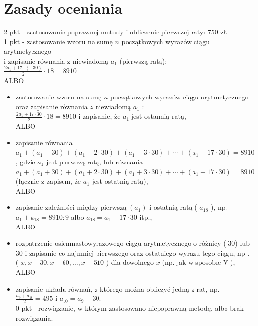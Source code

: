 \documentclass[10pt]{article}
\begin{document}
\section*{Zasady oceniania}
2 pkt - zastosowanie poprawnej metody i obliczenie pierwszej raty: 750 zł.\\
1 pkt - zastosowanie wzoru na sumę $n$ początkowych wyrazów ciągu arytmetycznego\\
i zapisanie równania z niewiadomą $a_{1}$ (pierwszą ratą):\\
$\frac{2 a_{1}+17 \cdot(-30)}{2} \cdot 18=8910$\\
ALBO

\begin{itemize}
  \item zastosowanie wzoru na sumę $n$ początkowych wyrazów ciągu arytmetycznego oraz zapisanie równania $z$ niewiadomą $a_{1}$ :\\
$\frac{2 a_{1}+17 \cdot 30}{2} \cdot 18=8910$ i zapisanie, że $a_{1}$ jest ostannią ratą,\\
ALBO
  \item zapisanie równania\\
$a_{1}+\left(a_{1}-30\right)+\left(a_{1}-2 \cdot 30\right)+\left(a_{1}-3 \cdot 30\right)+\cdots+\left(a_{1}-17 \cdot 30\right)=8910$, gdzie $a_{1}$ jest pierwszą ratą, lub równania\\
$a_{1}+\left(a_{1}+30\right)+\left(a_{1}+2 \cdot 30\right)+\left(a_{1}+3 \cdot 30\right)+\cdots+\left(a_{1}+17 \cdot 30\right)=8910$\\
(łącznie z zapisem, że $a_{1}$ jest ostatnią ratą),\\
ALBO
  \item zapisanie zależności między pierwszą $\left(a_{1}\right)$ i ostatnią ratą ( $a_{18}$ ), np.\\
$a_{1}+a_{18}=8910: 9$ albo $a_{18}=a_{1}-17 \cdot 30$ itp.,\\
ALBO
  \item rozpatrzenie osiemnastowyrazowego ciągu arytmetycznego o różnicy (-30) lub 30 i zapisanie co najmniej pierwszego oraz ostatniego wyrazu tego ciągu, np .\\
( $x, x-30, x-60, \ldots, x-510$ ) dla dowolnego $x$ (np. jak w sposobie V ), ALBO
  \item zapisanie układu równań, z którego można obliczyć jedną z rat, np.\\
$\frac{a_{9}+a_{10}}{2}=495$ i $a_{10}=a_{9}-30$.\\
0 pkt - rozwiązanie, w którym zastosowano niepoprawną metodę, albo brak rozwiązania.
\end{itemize}
\end{document}
